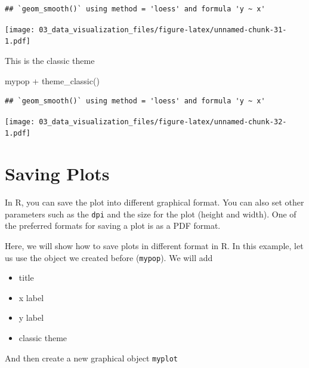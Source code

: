 \documentclass[
  10pt,
]{krantz}
\newenvironment{Shaded}{\begin{snugshade}}{\end{snugshade}}
\newcommand{\FunctionTok}[1]{\textcolor[rgb]{0.00,0.00,0.00}{#1}}
\newcommand{\NormalTok}[1]{#1}
\newcommand{\SpecialCharTok}[1]{\textcolor[rgb]{0.00,0.00,0.00}{#1}}
\providecommand{\tightlist}{%
  \setlength{\itemsep}{0pt}\setlength{\parskip}{0pt}}
\begin{document}
\begin{verbatim}
## `geom_smooth()` using method = 'loess' and formula 'y ~ x'
\end{verbatim}

\texttt{[image: 03\_data\_visualization\_files/figure-latex/unnamed-chunk-31-1.pdf]}

This is the classic theme

\begin{Shaded}
\begin{Highlighting}[]
\NormalTok{mypop }\SpecialCharTok{+} 
  \FunctionTok{theme\_classic}\NormalTok{()}
\end{Highlighting}
\end{Shaded}

\begin{verbatim}
## `geom_smooth()` using method = 'loess' and formula 'y ~ x'
\end{verbatim}

\texttt{[image: 03\_data\_visualization\_files/figure-latex/unnamed-chunk-32-1.pdf]}

\hypertarget{saving-plots}{%
\section{\texorpdfstring{Saving Plots}{Saving Plots}}\label{saving-plots}}

In R, you can save the plot into different graphical format. You can also set other parameters such as the \texttt{dpi} and the size for the plot (height and width). One of the preferred formats for saving a plot is as a PDF format.

Here, we will show how to save plots in different format in R. In this example, let us use the object we created before (\texttt{mypop}). We will add

\begin{itemize}
\tightlist
\item
  title
\item
  x label
\item
  y label
\item
  classic theme
\end{itemize}

And then create a new graphical object \texttt{myplot}
\end{document}
